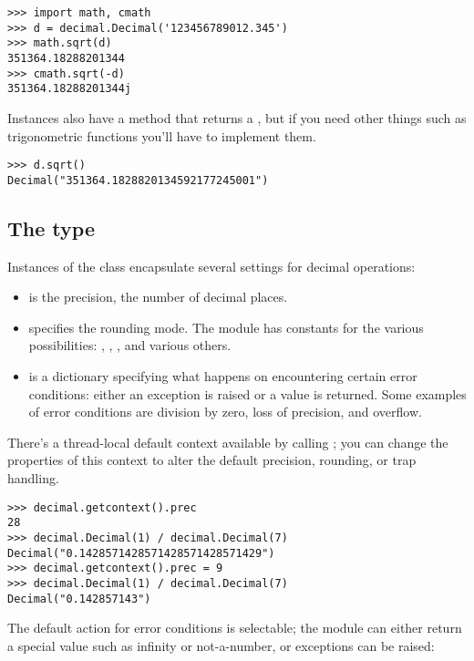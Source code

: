 \documentclass{howto}
\begin{document}
\begin{verbatim}
>>> import math, cmath
>>> d = decimal.Decimal('123456789012.345')
>>> math.sqrt(d)
351364.18288201344
>>> cmath.sqrt(-d)
351364.18288201344j
\end{verbatim}

Instances also have a  method that returns a
, but if you need other things such as trigonometric
functions you'll have to implement them.

\begin{verbatim}
>>> d.sqrt()
Decimal("351364.1828820134592177245001")
\end{verbatim}


\subsection{The  type}

Instances of the  class encapsulate several settings for 
decimal operations:

\begin{itemize}
 \item {} is the precision, the number of decimal places.
 \item {} specifies the rounding mode.  The 
       module has constants for the various possibilities:
       , , , and various others.
 \item {} is a dictionary specifying what happens on
encountering certain error conditions: either  an exception is raised or 
a value is returned.  Some examples of error conditions are
division by zero, loss of precision, and overflow.
\end{itemize}

There's a thread-local default context available by calling
; you can change the properties of this context
to alter the default precision, rounding, or trap handling.

\begin{verbatim}
>>> decimal.getcontext().prec
28
>>> decimal.Decimal(1) / decimal.Decimal(7)
Decimal("0.1428571428571428571428571429")
>>> decimal.getcontext().prec = 9 
>>> decimal.Decimal(1) / decimal.Decimal(7)
Decimal("0.142857143")
\end{verbatim}

The default action for error conditions is selectable; the module can
either return a special value such as infinity or not-a-number, or
exceptions can be raised:
\end{document}
